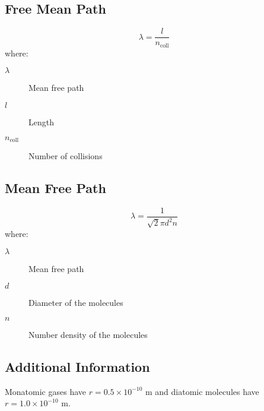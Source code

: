 \documentclass{article}
\begin{document}
\subsection{Free Mean Path}
\begin{equation}
\lambda = \frac{l}{n_{\text{coll}}}
\end{equation}
where:
\begin{description}
    \item[$\lambda$] Mean free path
    \item[$l$] Length
    \item[$n_{\text{coll}}$] Number of collisions
\end{description}
\subsection*{Mean Free Path}
\begin{equation}
\lambda = \frac{1}{\sqrt{2} \pi d^2 n}
\end{equation}
where:
\begin{description}
    \item[$\lambda$] Mean free path
    \item[$d$] Diameter of the molecules
    \item[$n$] Number density of the molecules
\end{description}

\subsection*{Additional Information}
Monatomic gases have \( r = 0.5 \times 10^{-10} \) m and diatomic molecules have \( r = 1.0 \times 10^{-10} \) m.
\end{document}
